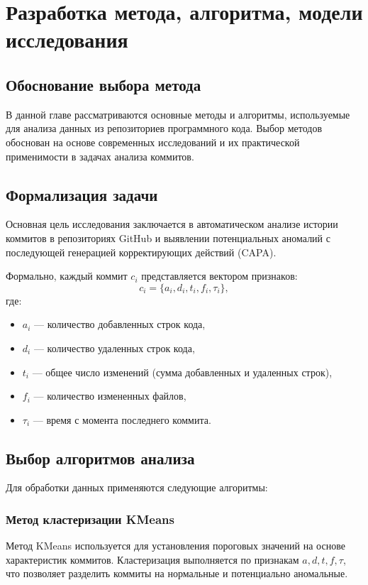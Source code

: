 \chapter{Разработка метода, алгоритма, модели исследования} \label{ch2}

\section{Обоснование выбора метода} \label{ch2:method_selection}

В данной главе рассматриваются основные методы и алгоритмы, используемые для анализа данных из репозиториев программного кода. Выбор методов обоснован на основе современных исследований и их практической применимости в задачах анализа коммитов.

\section{Формализация задачи} \label{ch2:problem_formulation}

Основная цель исследования заключается в автоматическом анализе истории коммитов в репозиториях GitHub и выявлении потенциальных аномалий с последующей генерацией корректирующих действий (CAPA). 

Формально, каждый коммит \( c_i \) представляется вектором признаков:
\begin{equation}
	c_i = \{a_i, d_i, t_i, f_i, \tau_i\},
\end{equation}
где:
\begin{itemize}
	\item \( a_i \) --- количество добавленных строк кода,
	\item \( d_i \) --- количество удаленных строк кода,
	\item \( t_i \) --- общее число изменений (сумма добавленных и удаленных строк),
	\item \( f_i \) --- количество измененных файлов,
	\item \( \tau_i \) --- время с момента последнего коммита.
\end{itemize}

\section{Выбор алгоритмов анализа} \label{ch2:algorithm_selection}

Для обработки данных применяются следующие алгоритмы:

\subsection{Метод кластеризации KMeans}
Метод KMeans используется для установления пороговых значений на основе характеристик коммитов. Кластеризация выполняется по признакам \( a, d, t, f, \tau \), что позволяет разделить коммиты на нормальные и потенциально аномальные.


